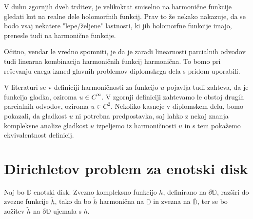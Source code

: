 \documentclass[mat1]{fmfdelo}
\begin{document}
    \begin{opomba}
        V duhu zgornjih dveh trditev, je velikokrat smiselno na harmonične funkcije gledati kot na realne dele holomorfnih funkcij. Prav to že nekako nakazuje, da se bodo vsaj nekatere "lepe/željene" lastnosti, ki jih holomorfne funkcije imajo, prenesle tudi na harmonične funkcije.
    \end{opomba}
    \begin{opomba}
        \label{lin}
        Očitno, vendar le vredno spomniti, je da je zaradi linearnosti parcialnih odvodov tudi linearna kombinacija harmoničnih funkcij harmonična. To bomo pri reševanju enega izmed glavnih problemov diplomskega dela s pridom uporabili.
    \end{opomba}
    \begin{opomba}
        V literaturi se v definiciji harmoničnosti za funkcijo $u$ pojavlja tudi zahteva, da je funkcija gladka, oziroma $u \in C^{\infty}$. V zgornji definiciji zahtevamo le obstoj drugih parcialnih odvodov, oziroma $u \in C^2$. 
        Nekoliko kasneje v diplomskem delu, bomo pokazali, da gladkost $u$ ni potrebna predpostavka, saj lahko z nekaj znanja kompleksne analize gladkost $u$ izpeljemo iz harmoničnosti $u$ in s tem pokažemo ekvivalentnost definicij. 
    \end{opomba}


\section{Dirichletov problem za enotski disk}
    \begin{pro}
        Naj bo $\mathbb{D}$ enotski disk. Zvezno kompleksno funkcijo $h$, definirano na $\partial \mathbb{D}$, razširi do zvezne funkcije $\widetilde{h}$, tako da bo $\widetilde{h}$ harmonična na $\mathbb{D}$ in zvezna na $\overline{\mathbb{D}}$, ter se bo zožitev $\widetilde{h}$ na $\partial \mathbb{D}$ ujemala s $h$.
    \end{pro}
\end{document}
